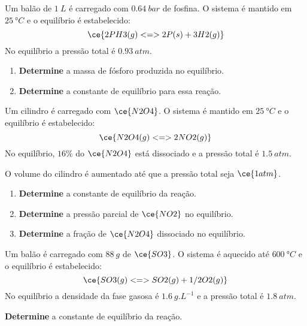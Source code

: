 \begin{problem}[
	id={2F45},
	path={/home/braun/Documents/Developer/braunchem/data/problems/Q2/2F/2F45}
]
Um balão de {\(\qty{1}{\unit{L}}\)} é carregado com {\(\qty{0,64}{\unit{bar}}\)} de fosfina. O sistema é mantido em {\(\qty{25}{\unit{\degree C}}\)} e
o equilíbrio é estabelecido: {\[
\ce{ 2 PH3(g) <=> 2 P(s) + 3 H2(g) }
\]} No equilíbrio a pressão total é {\(\qty{0,93}{\unit{atm}}\)}.

\begin{enumerate}
\def\labelenumi{\alph{enumi}.}
\tightlist
\item
  \textbf{Determine} a massa de fósforo produzida no equilíbrio.
\item
  \textbf{Determine} a constante de equilíbrio para essa reação.
\end{enumerate}

\end{problem}


\begin{problem}[
	id={2F46},
	path={/home/braun/Documents/Developer/braunchem/data/problems/Q2/2F/2F46}
]
Um cilindro é carregado com {\(\ce{N2O4}\)}. O sistema é mantido em {\(\qty{25}{\unit{\degree C}}\)} e o equilíbrio é estabelecido: {\[
\ce{ N2O4(g) <=> 2 NO2(g) }
\]} No equilíbrio, {\(\num{16}\%\)} do {\(\ce{N2O4}\)} está dissociado e a pressão total é {\(\qty{1,5}{\unit{atm}}\)}.

O volume do cilindro é aumentado até que a pressão total seja {\(\ce{1 atm}\)}.

\begin{enumerate}
\def\labelenumi{\alph{enumi}.}
\tightlist
\item
  \textbf{Determine} a constante de equilíbrio da reação.
\item
  \textbf{Determine} a pressão parcial de {\(\ce{NO2}\)} no equilíbrio.
\item
  \textbf{Determine} a fração de {\(\ce{N2O4}\)} dissociado no equilíbrio.
\end{enumerate}

\end{problem}


\begin{problem}[
	id={2F47},
	path={/home/braun/Documents/Developer/braunchem/data/problems/Q2/2F/2F47}
]
Um balão é carregado com {\(\qty{88}{\unit{g}}\)} de {\(\ce{SO3}\)}. O sistema é aquecido até {\(\qty{600}{\unit{\degree C}}\)} e o equilíbrio é
estabelecido: {\[
    \ce{ SO3(g) <=> SO2(g) + 1/2 O2(g) }
\]} No equilíbrio a densidade da fase gasosa é {\(\qty{1,6}{\unit{g.L^{-1}}}\)} e a pressão total é {\(\qty{1,8}{\unit{atm}}\)}.

\textbf{Determine} a constante de equilíbrio da reação.

\end{problem}


